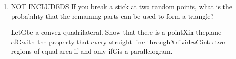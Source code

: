 \documentclass[a4paper]{article}
\begin{document}
\begin{enumerate}
    \item
    NOT INCLUDEDS
    If you break a stick at two random points, what is the probability that the remaining parts can be used to form a triangle?
    
	LetGbe a convex quadrilateral. Show that there is a pointXin theplane ofGwith the property that every straight line throughXdividesGinto two regions of equal area if and only ifGis a parallelogram.
	
\end{enumerate}
\end{document}
